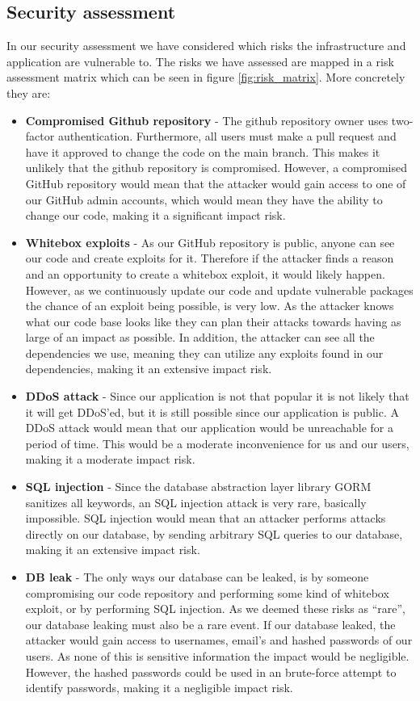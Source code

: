 \subsection{Security assessment}
In our security assessment we have considered which risks the infrastructure and application are vulnerable to. The risks we have assessed are mapped in a risk assessment matrix which can be seen in figure \ref{fig:risk_matrix}. More concretely they are:
\begin{itemize}
    \item \textbf{Compromised Github repository} - The github repository owner uses two-factor authentication. Furthermore, all users must make a pull request and have it approved to change the code on the main branch. This makes it unlikely that the github repository is compromised. However, a compromised GitHub repository would mean that the attacker would gain access to one of our GitHub admin accounts, which would mean they have the ability to change our code, making it a significant impact risk.
    \item \textbf{Whitebox exploits} - As our GitHub repository is public, anyone can see our code and create exploits for it. Therefore if the attacker finds a reason and an opportunity to create a whitebox exploit, it would likely happen. However, as we continuously update our code and update vulnerable packages the chance of an exploit being possible, is very low. As the attacker knows what our code base looks like they can plan their attacks towards having as large of an impact as possible. In addition, the attacker can see all the dependencies we use, meaning they can utilize any exploits found in our dependencies, making it an extensive impact risk.
    \item \textbf{DDoS attack} - Since our application is not that popular it is not likely that it will get DDoS’ed, but it is still possible since our application is public. A DDoS attack would mean that our application would be unreachable for a period of time. This would be a moderate inconvenience for us and our users, making it a moderate impact risk.
    \item \textbf{SQL injection} - Since the database abstraction layer library GORM sanitizes all keywords, an SQL injection attack is very rare, basically impossible. SQL injection would mean that an attacker performs attacks directly on our database, by sending arbitrary SQL queries to our database, making it an extensive impact risk.
    \item \textbf{DB leak} - The only ways our database can be leaked, is by someone compromising our code repository and performing some kind of whitebox exploit, or by performing SQL injection. As we deemed these risks as “rare”, our database leaking must also be a rare event. If our database leaked, the attacker would gain access to usernames, email’s and hashed passwords of our users. As none of this is sensitive information the impact would be negligible. However, the hashed passwords could be used in an brute-force attempt to identify passwords, making it a negligible impact risk.
\end{itemize}

